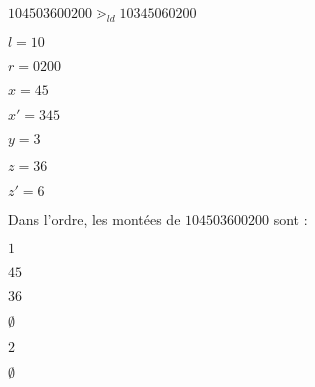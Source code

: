 \begin{example}[Définition 8 : $n = 5$]
    $104503600200 \gtrdot_{ld} 10345060200$
    ~\\
    \begin{itemize*}
        \item $l = 10$
        \item $r = 0200$
        \item $x = 45$
        \item $x' = 345$
        \item $y = 3$
        \item $z = 36$
        \item $z' = 6$
    \end{itemize*}
    
\end{example}

\begin{example}[Définition 9 : $n = 5$]
    Dans l'ordre, les montées de $104503600200$ sont :\\
    \begin{itemize*}
        \item $1$
        \item $45$
        \item $36$
        \item $\emptyset$
        \item $2$
        \item $\emptyset$
    \end{itemize*}
\end{example}